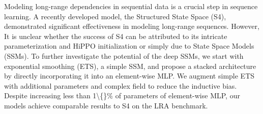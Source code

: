 Modeling long-range dependencies in sequential data is a crucial step in sequence learning.  A recently developed model, the Structured State Space (S4),  demonstrated significant effectiveness in modeling long-range sequences. However, It is unclear whether the success of S4 can be attributed to its intricate parameterization and HiPPO initialization or simply due to State Space Models (SSMs). To further investigate the potential of the deep SSMs, we start with exponential smoothing (ETS), a simple SSM, and propose a stacked architecture by directly incorporating it into an element-wise MLP. We augment simple ETS with additional parameters and complex field to reduce the inductive bias. Despite increasing less than 1\textbackslash\{\}\% of parameters of element-wise MLP, our models achieve comparable results to S4 on the LRA benchmark.